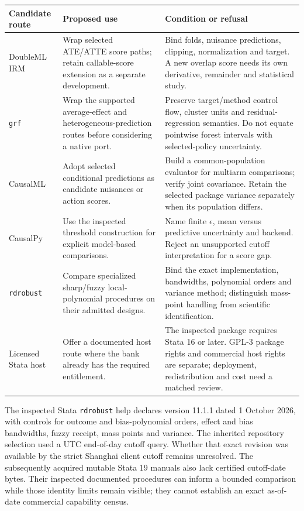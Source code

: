 \begin{longtable}{p{}p{}p{}}
\toprule
Candidate route&Proposed use&Condition or refusal\\ \midrule
DoubleML IRM&Wrap selected ATE/ATTE score paths; retain callable-score extension
as a separate development.&Bind folds, nuisance predictions, clipping,
normalization and target. A new overlap score needs its own derivative,
remainder and statistical study.\\
\texttt{grf}&Wrap the supported average-effect and heterogeneous-prediction
routes before considering a native port.&Preserve target/method control flow,
cluster units and residual-regression semantics. Do not equate pointwise
forest intervals with selected-policy uncertainty.\\
CausalML&Adopt selected conditional predictions as candidate nuisances or
action scores.&Build a common-population evaluator for multiarm comparisons;
verify joint covariance. Retain the selected package variance separately when
its population differs.\\
CausalPy&Use the inspected threshold construction for explicit model-based
comparisons.&Name finite $\epsilon$, mean versus predictive uncertainty and
backend. Reject an unsupported cutoff interpretation for a score gap.\\
\texttt{rdrobust}&Compare specialized sharp/fuzzy local-polynomial procedures
on their admitted designs.&Bind the exact implementation, bandwidths,
polynomial orders and variance method; distinguish mass-point handling from
scientific identification.\\
Licensed Stata host&Offer a documented host route where the bank already has
the required entitlement.&The inspected package requires Stata 16 or later.
GPL-3 package rights and commercial host rights are separate; deployment,
redistribution and cost need a matched review.\\ \bottomrule
\end{longtable}

The inspected Stata \texttt{rdrobust} help declares version 11.1.1 dated
1 October 2026, with controls for outcome and bias-polynomial orders, effect
and bias bandwidths, fuzzy receipt, mass points and variance. The inherited
repository selection used a UTC end-of-day cutoff query. Whether that exact
revision was available by the strict Shanghai client cutoff remains unresolved.
The subsequently acquired mutable Stata 19 manuals also lack certified
cutoff-date bytes. Their inspected documented procedures can inform a bounded
comparison while those identity limits remain visible; they cannot establish
an exact as-of-date commercial capability census.\citep{exec13_ivrd_rdrobust,exec13_ivrd_stata}

